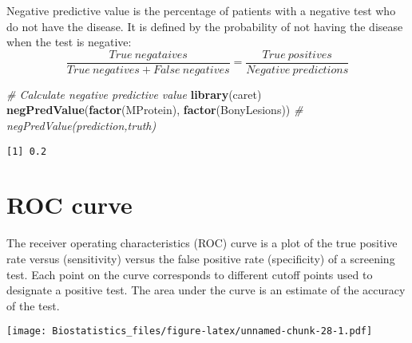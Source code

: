 \documentclass[]{book}
\newenvironment{Shaded}{\begin{snugshade}}{\end{snugshade}}
\newcommand{\KeywordTok}[1]{\textcolor[rgb]{0.13,0.29,0.53}{\textbf{#1}}}
\newcommand{\DataTypeTok}[1]{\textcolor[rgb]{0.13,0.29,0.53}{#1}}
\newcommand{\StringTok}[1]{\textcolor[rgb]{0.31,0.60,0.02}{#1}}
\newcommand{\CommentTok}[1]{\textcolor[rgb]{0.56,0.35,0.01}{\textit{#1}}}
\newcommand{\OperatorTok}[1]{\textcolor[rgb]{0.81,0.36,0.00}{\textbf{#1}}}
\newcommand{\NormalTok}[1]{#1}
\theoremstyle{definition}
\theoremstyle{definition}
\theoremstyle{definition}
\theoremstyle{remark}
\begin{document}
Negative predictive value is the percentage of patients with a negative
test who do not have the disease. It is defined by the probability of
not having the disease when the test is negative:
\[{\frac{True\ negataives}{True\ negatives + False\ negatives}=\frac{True\ positives}{Negative\ predictions}}\]

\begin{Shaded}
\begin{Highlighting}[]
\CommentTok{# Calculate negative predictive value}
\KeywordTok{library}\NormalTok{(caret)}
\KeywordTok{negPredValue}\NormalTok{(}\KeywordTok{factor}\NormalTok{(MProtein), }\KeywordTok{factor}\NormalTok{(BonyLesions)) }\CommentTok{# negPredValue(prediction,truth)}
\end{Highlighting}
\end{Shaded}

\begin{verbatim}
[1] 0.2
\end{verbatim}

\section{ROC curve}\label{roc-curve}

The receiver operating characteristics (ROC) curve is a plot of the true
positive rate versus (sensitivity) versus the false positive rate
(specificity) of a screening test. Each point on the curve corresponds
to different cutoff points used to designate a positive test. The area
under the curve is an estimate of the accuracy of the test.

\begin{Shaded}
\end{Shaded}

\texttt{[image: Biostatistics\_files/figure-latex/unnamed-chunk-28-1.pdf]}

\begin{Shaded}
\end{Shaded}
\end{document}
